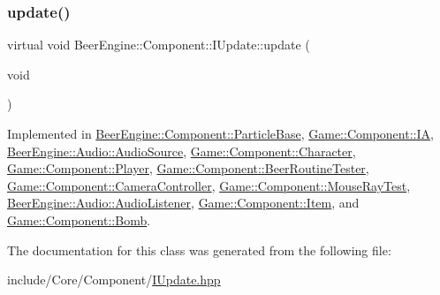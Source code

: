 \mbox{\label{class_beer_engine_1_1_component_1_1_i_update_aeeda0aa303175720e449b4c51d9867dd}} 
\subsubsection{\texorpdfstring{update()}{update()}}
{\footnotesize\ttfamily virtual void Beer\+Engine\+::\+Component\+::\+I\+Update\+::update (\begin{DoxyParamCaption}\item[{void}]{ }\end{DoxyParamCaption})\hspace{0.3cm}{\ttfamily [pure virtual]}}



Implemented in \mbox{\hyperlink{class_beer_engine_1_1_component_1_1_particle_base_a2aad03916144a503ca8aee36637a5f76}{Beer\+Engine\+::\+Component\+::\+Particle\+Base}}, \mbox{\hyperlink{class_game_1_1_component_1_1_i_a_a5890e0da2fb55d58868c0cd441c33dc4}{Game\+::\+Component\+::\+IA}}, \mbox{\hyperlink{class_beer_engine_1_1_audio_1_1_audio_source_aaf476320ad96ecb33951f349f5112c54}{Beer\+Engine\+::\+Audio\+::\+Audio\+Source}}, \mbox{\hyperlink{class_game_1_1_component_1_1_character_ae8fe4181d3161364df101404589b8565}{Game\+::\+Component\+::\+Character}}, \mbox{\hyperlink{class_game_1_1_component_1_1_player_a52212c267395699de71b77e88b93032d}{Game\+::\+Component\+::\+Player}}, \mbox{\hyperlink{class_game_1_1_component_1_1_beer_routine_tester_a2f14ce6211722f92a8ec5886dbeabd6c}{Game\+::\+Component\+::\+Beer\+Routine\+Tester}}, \mbox{\hyperlink{class_game_1_1_component_1_1_camera_controller_a675655ee2e18382203f1afa2329a1739}{Game\+::\+Component\+::\+Camera\+Controller}}, \mbox{\hyperlink{class_game_1_1_component_1_1_mouse_ray_test_af5bf853e25dd4e70386dfecd4dc7dab9}{Game\+::\+Component\+::\+Mouse\+Ray\+Test}}, \mbox{\hyperlink{class_beer_engine_1_1_audio_1_1_audio_listener_a32c348d619ff2ca57d16af803d7dfcfd}{Beer\+Engine\+::\+Audio\+::\+Audio\+Listener}}, \mbox{\hyperlink{class_game_1_1_component_1_1_item_ac4e5deede6846817d6c818f8c8404fdc}{Game\+::\+Component\+::\+Item}}, and \mbox{\hyperlink{class_game_1_1_component_1_1_bomb_a6685384996c92b8d3f0955c2f6a335b5}{Game\+::\+Component\+::\+Bomb}}.



The documentation for this class was generated from the following file\+:\begin{DoxyCompactItemize}
\item 
include/\+Core/\+Component/\mbox{\hyperlink{_i_update_8hpp}{I\+Update.\+hpp}}\end{DoxyCompactItemize}
